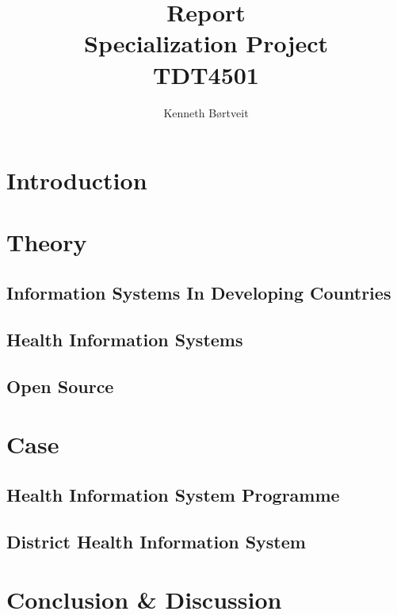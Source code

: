 \documentclass[10pt, a4paper]{report}
\title{Report \\ Specialization Project \\ TDT4501}
\author{Kenneth Børtveit}
\begin{document}
\maketitle
\tableofcontents
\listoffigures
\listoftables
\begin{abstract}

\end{abstract}
\part{Introduction}
\part{Theory}
\chapter{Information Systems In Developing Countries}
\chapter{Health Information Systems}
\chapter{Open Source}
\part{Case}
\chapter{Health Information System Programme}
\chapter{District Health Information System}
\part{Conclusion \& Discussion}
\end{document}

